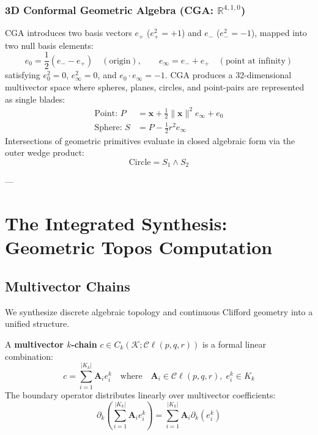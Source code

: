 \subsubsection{3D Conformal Geometric Algebra (CGA: $\mathbb{R}^{4,1,0}$)}
CGA introduces two basis vectors $e_+$ ($e_+^2 = +1$) and $e_-$ ($e_-^2 = -1$), mapped into two null basis elements:
\begin{equation}
    e_0 = \frac{1}{2}(e_- - e_+) \quad (\text{origin}), \qquad e_\infty = e_- + e_+ \quad (\text{point at infinity})
\end{equation}
satisfying $e_0^2 = 0$, $e_\infty^2 = 0$, and $e_0 \cdot e_\infty = -1$. CGA produces a 32-dimensional multivector space where spheres, planes, circles, and point-pairs are represented as single blades:
\begin{align}
    \text{Point: } P &= \mathbf{x} + \frac{1}{2}\|\mathbf{x}\|^2 e_\infty + e_0 \\
    \text{Sphere: } S &= P - \frac{1}{2}r^2 e_\infty
\end{align}
Intersections of geometric primitives evaluate in closed algebraic form via the outer wedge product:
\begin{equation}
    \text{Circle} = S_1 \wedge S_2
\end{equation}

---

\section{The Integrated Synthesis: Geometric Topos Computation}
\label{sec:integrated_synthesis}

\subsection{Multivector Chains}
We synthesize discrete algebraic topology and continuous Clifford geometry into a unified structure.

\begin{definition}
A \textbf{multivector $k$-chain} $c \in C_k(\mathcal{K}; \mathcal{C}\ell(p,q,r))$ is a formal linear combination:
\begin{equation}
    c = \sum_{i=1}^{|K_k|} \mathbf{A}_i e_i^k \quad \text{where} \quad \mathbf{A}_i \in \mathcal{C}\ell(p,q,r), \; e_i^k \in K_k
\end{equation}
The boundary operator distributes linearly over multivector coefficients:
\begin{equation}
    \partial_k\left( \sum_{i=1}^{|K_k|} \mathbf{A}_i e_i^k \right) = \sum_{i=1}^{|K_k|} \mathbf{A}_i \partial_k(e_i^k)
\end{equation}
\end{definition}

